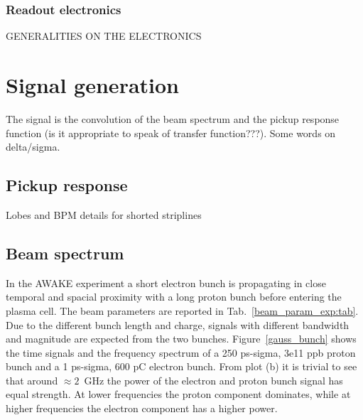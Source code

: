 \subsubsection{Readout electronics}

GENERALITIES ON THE ELECTRONICS



\section[Signal generation]{Signal generation}

The signal is the convolution of the beam spectrum and the pickup response function (is it appropriate to speak of transfer function???). Some words on delta/sigma.

\subsection[Pickup response]{Pickup response}

Lobes and BPM details for shorted striplines

\subsection[Beam spectrum]{Beam spectrum}

In the AWAKE experiment a short electron bunch is propagating in close temporal and spacial proximity with a long proton bunch before entering the plasma cell. The beam parameters are reported in Tab.~\ref{beam_param_exp:tab}. Due to the different bunch length and charge, signals with different bandwidth and magnitude are expected from the two bunches. Figure~\ref{gauss_bunch} shows the time signals and the frequency spectrum of a 250 ps-sigma, 3e11 ppb proton bunch and a 1 ps-sigma, 600 pC electron bunch. From plot (b) it is trivial to see that around $\approx2$~GHz the power of the electron and proton bunch signal has equal strength. At lower frequencies the proton component dominates, while at higher frequencies the electron component has a higher power.

